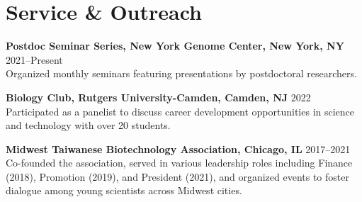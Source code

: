 \documentclass[letterpaper,11pt]{cv}
\begin{document}
\section{Service \& Outreach}
\begin{entrylist}

    \item \textbf{Postdoc Seminar Series, New York Genome Center, New York, NY} \hfill 2021--Present \\
    {\small Organized monthly seminars featuring presentations by postdoctoral researchers.}

    \item \textbf{Biology Club, Rutgers University-Camden, Camden, NJ} \hfill 2022\\
    {\small Participated as a panelist to discuss career development opportunities in science and technology with over 20 students.}
    
    \item \textbf{Midwest Taiwanese Biotechnology Association, Chicago, IL} \hfill 2017--2021\\
    {\small Co-founded the association, served in various leadership roles including Finance (2018), Promotion (2019), and President (2021), and organized events to foster dialogue among young scientists across Midwest cities.}

\end{entrylist}
\end{document}
